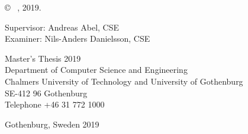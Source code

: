 \copyright ~ \me, 2019. \vspace{1cm}

Supervisor: Andreas Abel, CSE\\
Examiner: Nils-Anders Danielsson, CSE
\vspace{1cm}

Master's Thesis 2019\\	%
Department of Computer Science and Engineering\\
Chalmers University of Technology and University of Gothenburg\\
SE-412 96 Gothenburg\\
Telephone +46 31 772 1000 \vspace{0.5cm}

\vfill

Gothenburg, Sweden 2019

